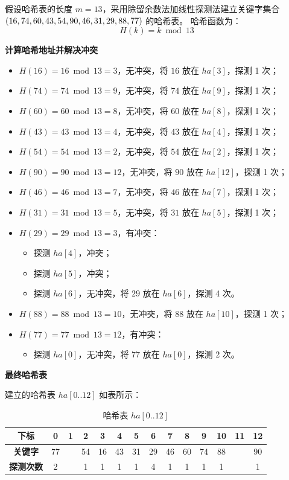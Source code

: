 \documentclass[lang=cn,newtx,10pt,scheme=chinese]{../elegantbook}
\begin{document}
假设哈希表的长度 $m = 13$，采用除留余数法加线性探测法建立关键字集合 $(16, 74, 60, 43, 54, 90, 46, 31, 29, 88, \\77)$ 的哈希表。  
哈希函数为：
\[
H(k) = k \bmod 13
\]


\textbf{计算哈希地址并解决冲突}  

\begin{itemize}
  \item $H(16) = 16 \bmod 13 = 3$，无冲突，将 $16$ 放在 $ha[3]$，探测 1 次；
  \item $H(74) = 74 \bmod 13 = 9$，无冲突，将 $74$ 放在 $ha[9]$，探测 1 次；
  \item $H(60) = 60 \bmod 13 = 8$，无冲突，将 $60$ 放在 $ha[8]$，探测 1 次；
  \item $H(43) = 43 \bmod 13 = 4$，无冲突，将 $43$ 放在 $ha[4]$，探测 1 次；
  \item $H(54) = 54 \bmod 13 = 2$，无冲突，将 $54$ 放在 $ha[2]$，探测 1 次；
  \item $H(90) = 90 \bmod 13 = 12$，无冲突，将 $90$ 放在 $ha[12]$，探测 1 次；
  \item $H(46) = 46 \bmod 13 = 7$，无冲突，将 $46$ 放在 $ha[7]$，探测 1 次；
  \item $H(31) = 31 \bmod 13 = 5$，无冲突，将 $31$ 放在 $ha[5]$，探测 1 次；
  \item $H(29) = 29 \bmod 13 = 3$，有冲突：
    \begin{itemize}
      \item 探测 $ha[4]$，冲突；
      \item 探测 $ha[5]$，冲突；
      \item 探测 $ha[6]$，无冲突，将 $29$ 放在 $ha[6]$，探测 4 次。
    \end{itemize}
  \item $H(88) = 88 \bmod 13 = 10$，无冲突，将 $88$ 放在 $ha[10]$，探测 1 次；
  \item $H(77) = 77 \bmod 13 = 12$，有冲突：
    \begin{itemize}
      \item 探测 $ha[0]$，无冲突，将 $77$ 放在 $ha[0]$，探测 2 次。
    \end{itemize}
\end{itemize}


\textbf{最终哈希表}  

建立的哈希表 $ha[0..12]$ 如表所示：

\begin{table}[!htbp]
  \centering
  \caption{哈希表 $ha[0..12]$}
  \begin{tabular}{|c|c|c|c|c|c|c|c|c|c|c|c|c|c|}
  \hline
  \textbf{下标}     & 0  & 1  & 2  & 3  & 4  & 5  & 6  & 7  & 8  & 9  & 10 & 11 & 12 \\ \hline
  \textbf{关键字}   & 77 &    & 54 & 16 & 43 & 31 & 29 & 46 & 60 & 74 & 88 &    & 90 \\ \hline
  \textbf{探测次数} & 2  &    & 1  & 1  & 1  & 1  & 4  & 1  & 1  & 1  & 1  &    & 1  \\ \hline
  \end{tabular}
\end{table}
\end{document}
